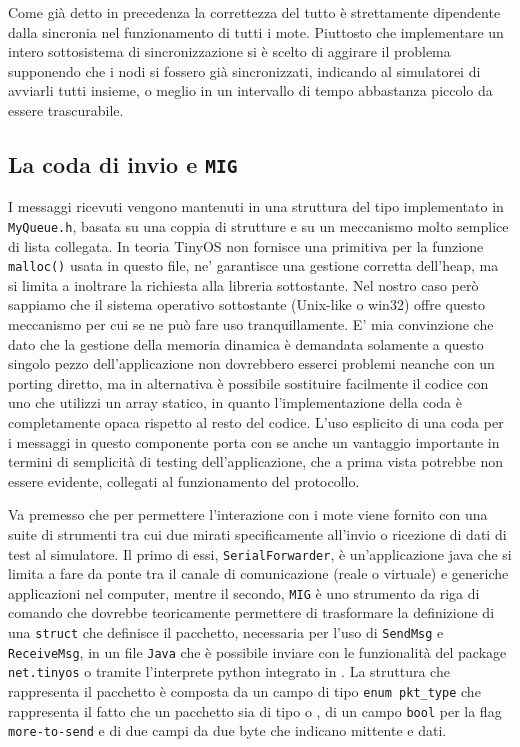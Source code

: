 \documentclass[twoside,11pt,a4paper,italian,openany]{book}
\begin{document}
Come già detto in precedenza la correttezza del tutto è strettamente dipendente dalla sincronia 
nel funzionamento di tutti i mote. Piuttosto che implementare un intero sottosistema 
di sincronizzazione si è scelto di aggirare il problema supponendo che i nodi si fossero già 
sincronizzati, indicando al simulatorei di avviarli tutti insieme, o meglio in un intervallo di tempo abbastanza piccolo da essere trascurabile. 

\subsection{La coda di invio e \texttt{MIG}}
I messaggi ricevuti vengono mantenuti in una struttura del tipo implementato in
 \texttt{MyQueue.h},
basata su una coppia di strutture e su un meccanismo molto semplice di lista collegata. 
In teoria TinyOS non fornisce una primitiva per la funzione \texttt{malloc()} usata in questo 
file, ne' garantisce una gestione corretta dell'heap, ma si limita a inoltrare la richiesta 
alla libreria sottostante.  Nel nostro caso però sappiamo che il sistema operativo sottostante 
(Unix-like o win32) offre questo meccanismo per cui se ne può fare uso tranquillamente. 
E' mia convinzione che dato che la gestione della memoria dinamica è demandata solamente a 
questo singolo pezzo dell'applicazione non dovrebbero esserci problemi neanche con un porting 
diretto, ma in alternativa è possibile sostituire facilmente il codice con uno che utilizzi un 
array statico, in quanto l'implementazione della coda è completamente opaca rispetto al 
resto del codice. 
L'uso esplicito di una coda per i messaggi in questo componente porta con se anche un 
vantaggio importante in termini di semplicità di testing dell'applicazione, che a prima vista 
potrebbe non essere evidente, collegati al funzionamento del protocollo. 

Va premesso che per permettere l'interazione con i mote \tos viene fornito con una suite di 
strumenti tra cui due mirati specificamente all'invio o ricezione di dati di test al simulatore. 
Il primo di essi, \texttt{SerialForwarder}, è un'applicazione java che si limita a fare da ponte 
tra il canale di comunicazione (reale o virtuale) e generiche applicazioni nel computer, mentre 
il secondo, \texttt{MIG} è uno strumento da riga di comando che dovrebbe teoricamente 
permettere di trasformare la definizione di una \texttt{struct} che definisce il pacchetto, 
necessaria per l'uso di \texttt{SendMsg} e \texttt{ReceiveMsg}, in un file \texttt{Java} che è 
possibile inviare con le funzionalità del package \texttt{net.tinyos} o tramite l'interprete 
python integrato in \tv. 
La struttura che rappresenta il pacchetto è composta da un campo di tipo \texttt{enum pkt\_type}
che rappresenta il fatto che un pacchetto sia di tipo \req o \ack, di un campo \texttt{bool} 
per la flag \texttt{more-to-send} e di due campi da due byte che indicano mittente e dati.
\end{document}
